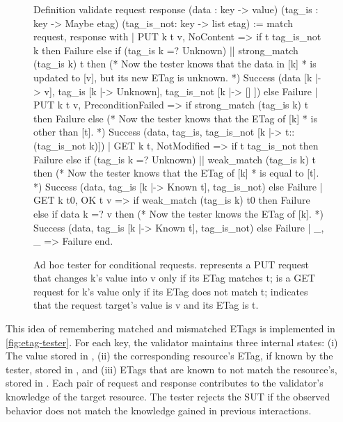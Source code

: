 \begin{figure}
\begin{coq}
  Definition validate request response
             (data      : key -> value)
             (tag_is    : key -> Maybe etag)
             (tag_is_not: key -> list etag) :=
    match request, response with
    | PUT k t v, NoContent => 
      if t \in tag_is_not k then Failure
      else if (tag_is k =? Unknown) || strong_match (tag_is k) t
      then (* Now the tester knows that the data in [k]
            * is updated to [v], but its new ETag is unknown. *)
        Success (data       [k |-> v],
                 tag_is     [k |-> Unknown],
                 tag_is_not [k |-> [] ])
      else Failure
    | PUT k t v, PreconditionFailed =>
      if strong_match (tag_is k) t then Failure
      else (* Now the tester knows that the ETag of [k]
            * is other than [t]. *)
        Success (data, tag_is, tag_is_not [k |-> t::(tag_is_not k)])
    | GET k t, NotModified =>
      if t \in tag_is_not then Failure
      else if (tag_is k =? Unknown) || weak_match (tag_is k) t
      then (* Now the tester knows that the ETag of [k]
            * is equal to [t]. *)
        Success (data, tag_is [k |-> Known t], tag_is_not)
      else Failure
    | GET k t0, OK t v =>
      if weak_match (tag_is k) t0 then Failure
      else if data k =? v
      then (* Now the tester knows the ETag of [k]. *)
        Success (data, tag_is [k |-> Known t], tag_is_not)
      else Failure
    | _, _ => Failure
    end.    
\end{coq}
\vspace*{1em}
  \caption[Ad hoc tester for \http conditional requests.]{Ad hoc tester for
    \http conditional requests.   represents a PUT request that
    changes \ilc k's value into \ilc v only if its ETag matches \ilc t;  is a GET request for \ilc k's value only if its ETag does not match
    \ilc t;  indicates that the request target's value is \ilc v and
    its ETag is \ilc t.}
  \label{fig:etag-tester}
\end{figure}

This idea of remembering matched and mismatched ETags is implemented in
\autoref{fig:etag-tester}.  For each key, the validator maintains three internal
states: (i) The value stored in , (ii) the corresponding resource's
ETag, if known by the tester, stored in , and (iii) ETags that are
known to not match the resource's, stored in .  Each pair of
request and response contributes to the validator's knowledge of the target
resource.  The tester rejects the SUT if the observed behavior does not match
the knowledge gained in previous interactions.

